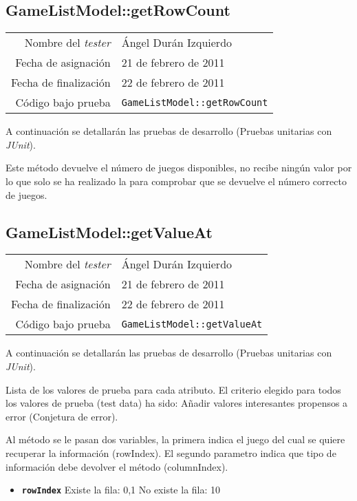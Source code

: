 \subsection{GameListModel::getRowCount}

{\small
\begin{tabular}{r|l}
Nombre del \textit{tester} & \'Angel Dur\'an Izquierdo\\
Fecha de asignación & 21 de febrero de 2011 \\
Fecha de finalización & 22 de febrero de 2011 \\
Código bajo prueba & \texttt{GameListModel::getRowCount}
\end{tabular}
}

A continuación se detallarán las pruebas de desarrollo (Pruebas unitarias con \textit{JUnit}).

Este m\'etodo devuelve el n\'umero de juegos disponibles, no recibe ning\'un valor por lo que solo se ha realizado la para comprobar que se devuelve el n\'umero correcto de juegos.

\subsection{GameListModel::getValueAt}

{\small
\begin{tabular}{r|l}
Nombre del \textit{tester} & \'Angel Dur\'an Izquierdo\\
Fecha de asignación & 21 de febrero de 2011 \\
Fecha de finalización & 22 de febrero de 2011 \\
Código bajo prueba & \texttt{GameListModel::getValueAt}
\end{tabular}
}

A continuación se detallarán las pruebas de desarrollo (Pruebas unitarias con \textit{JUnit}).

Lista de los valores de prueba para cada atributo.
El criterio elegido para todos los valores de prueba (test data) ha sido: Añadir valores interesantes propensos a error (Conjetura de error).

Al m\'etodo se le pasan dos variables, la primera indica el juego del cual se quiere recuperar la informaci\'on (rowIndex). El segundo parametro indica que tipo de informaci\'on debe devolver el m\'etodo (columnIndex).

\begin{itemize}
\item \textbf{\texttt{rowIndex}}
\subitem Existe la fila: 0,1
\subitem No existe la fila: 10
\end{itemize}

